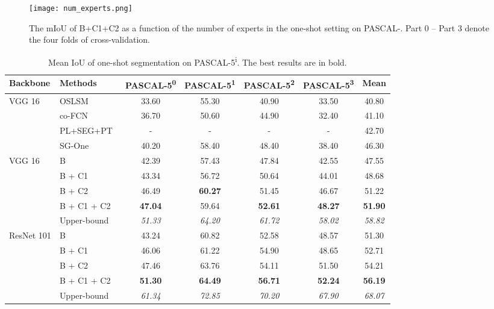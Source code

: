 \documentclass[10pt,twocolumn,letterpaper]{article}
\begin{document}
\begin{figure}[h!]
    \centering
    \texttt{[image: num\_experts.png]}
    \caption{The mIoU of B+C1+C2 as a function of the number of experts  in the one-shot setting on PASCAL-. Part 0 -- Part 3 denote the four folds of cross-validation.}
    \label{fig:num_experts}
\end{figure}



\begin{table*}[t]
  \centering
  \begin{tabular}{l|l|cccc|c}
    \hline
    \hline
    \textbf{Backbone} & \textbf{Methods} & \textbf{PASCAL-5\textsuperscript{0}} & \textbf{PASCAL-5\textsuperscript{1}} & \textbf{PASCAL-5\textsuperscript{2}} & \textbf{PASCAL-5\textsuperscript{3}} & \textbf{Mean} \\
     \hline
	VGG 16 & OSLSM~\cite{shaban2017one} &  33.60 & 55.30 & 40.90 & 33.50 & 40.80\\
& co-FCN~\cite{rakelly2018conditional} &  36.70  & 50.60 & 44.90 & 32.40 & 41.10 \\
& PL+SEG+PT~\cite{dong2018few} &  -  & - & - & - & 42.70 \\
& SG-One ~\cite{zhang2018sgone} & 40.20  & 58.40 & 48.40 & 38.40 & 46.30 \\
    \hline
    VGG 16& B &  42.39 & 57.43 & 47.84  & 42.55 & 47.55 \\
    & B + C1 & 43.34  & 56.72 & 50.64  & 44.01 & 48.68\\
    & B + C2 & 46.49 & \textbf{60.27} & 51.45  & 46.67 & 51.22 \\
    & B + C1 + C2 & \textbf{47.04 }& 59.64 & \textbf{52.61}  & \textbf{48.27} & \textbf{51.90} \\
    \cline{2-7}
    & Upper-bound & \textit{51.33} & \textit{64.20} & \textit{61.72}  & \textit{58.02} & \textit{58.82} \\
    \hline
    ResNet 101& B & 43.24  & 60.82 & 52.58  & 48.57  &  51.30 \\
    & B + C1 & 46.06  & 61.22 & 54.90  & 48.65 & 52.71 \\
    & B + C2 & 47.46  & 63.76 & 54.11  & 51.50 & 54.21 \\
    & B + C1 + C2 & \textbf{51.30} & \textbf{64.49} & \textbf{56.71}  & \textbf{52.24} & \textbf{56.19} \\
    \cline{2-7}
    & Upper-bound & \textit{61.34} & \textit{72.85} & \textit{70.20}  & \textit{67.90} & \textit{68.07} \\
    \hline
    \hline
  \end{tabular}
  \caption{Mean IoU  of one-shot segmentation on PASCAL-5\textsuperscript{i}. The best  results are in bold.}\label{tab:ablation}
\end{table*}
\end{document}
